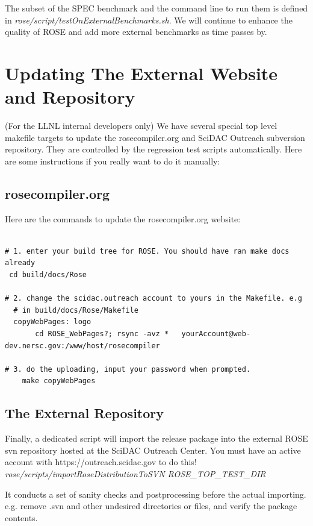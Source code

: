 The subset of the SPEC
benchmark and the command line to run them is defined in
\textit{rose/script/testOnExternalBenchmarks.sh}. 
We will continue to enhance the quality of ROSE and add more external
benchmarks as time passes by. 


\section{Updating The External Website and Repository}%
(For the LLNL internal developers only) We have several special top level
makefile targets to update the rosecompiler.org and SciDAC Outreach
subversion repository. They are controlled by the regression test scripts
automatically. Here are some instructions if you really want to do it manually:

\subsection{rosecompiler.org}
Here are the commands to update the rosecompiler.org website:
\begin{verbatim}

# 1. enter your build tree for ROSE. You should have ran make docs already
 cd build/docs/Rose

# 2. change the scidac.outreach account to yours in the Makefile. e.g 
  # in build/docs/Rose/Makefile
  copyWebPages: logo
       cd ROSE_WebPages?; rsync -avz *   yourAccount@web-dev.nersc.gov:/www/host/rosecompiler

# 3. do the uploading, input your password when prompted. 
    make copyWebPages  
\end{verbatim}

\subsection{The External Repository}
Finally, a dedicated script will import the release package into the
external ROSE svn repository hosted at the SciDAC Outreach Center. You must
have an active account with https://outreach.scidac.gov to do this!\\

\textit{rose/scripts/importRoseDistributionToSVN ROSE\_TOP\_TEST\_DIR}

It conducts a set of sanity checks and postprocessing before the actual importing. e.g. remove .svn and other undesired directories or files, and verify the package contents.


